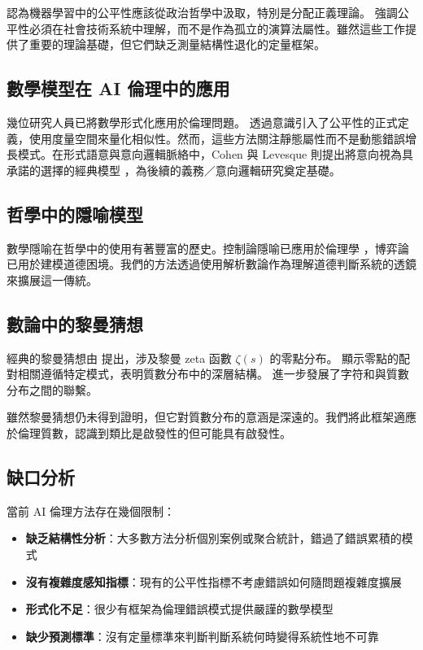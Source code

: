 \documentclass[12pt,a4paper]{article}
\theoremstyle{definition}
\theoremstyle{remark}
\begin{document}
\citet{binns2018} 認為機器學習中的公平性應該從政治哲學中汲取，特別是分配正義理論。\citet{selbst2019} 強調公平性必須在社會技術系統中理解，而不是作為孤立的演算法屬性。雖然這些工作提供了重要的理論基礎，但它們缺乏測量結構性退化的定量框架。

\subsection{數學模型在 AI 倫理中的應用}

幾位研究人員已將數學形式化應用於倫理問題。\citet{dwork2012} 透過意識引入了公平性的正式定義，使用度量空間來量化相似性。然而，這些方法關注靜態屬性而不是動態錯誤增長模式。在形式語意與意向邏輯脈絡中，Cohen 與 Levesque 則提出將意向視為具承諾的選擇的經典模型 \citep{cohen1990}，為後續的義務／意向邏輯研究奠定基礎。

\subsection{哲學中的隱喻模型}

數學隱喻在哲學中的使用有著豐富的歷史。控制論隱喻已應用於倫理學 \citep{floridi2018}，博弈論已用於建模道德困境。我們的方法透過使用解析數論作為理解道德判斷系統的透鏡來擴展這一傳統。

\subsection{數論中的黎曼猜想}

經典的黎曼猜想由 \citet{riemann1859} 提出，涉及黎曼 zeta 函數 $\zeta(s)$ 的零點分布。\citet{montgomery1973} 顯示零點的配對相關遵循特定模式，表明質數分布中的深層結構。\citet{granville2007} 進一步發展了字符和與質數分布之間的聯繫。

雖然黎曼猜想仍未得到證明，但它對質數分布的意涵是深遠的。我們將此框架適應於倫理質數，認識到類比是啟發性的但可能具有啟發性。

\subsection{缺口分析}

當前 AI 倫理方法存在幾個限制：
\begin{itemize}
    \item \textbf{缺乏結構性分析}：大多數方法分析個別案例或聚合統計，錯過了錯誤累積的模式
    \item \textbf{沒有複雜度感知指標}：現有的公平性指標不考慮錯誤如何隨問題複雜度擴展
    \item \textbf{形式化不足}：很少有框架為倫理錯誤模式提供嚴謹的數學模型
    \item \textbf{缺少預測標準}：沒有定量標準來判斷判斷系統何時變得系統性地不可靠
\end{itemize}
\end{document}

